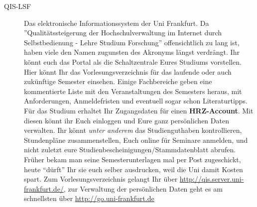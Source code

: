 \begin{description}
\item[QIS-LSF] Das elektronische Informationssystem der Uni Frankfurt.  Da
''Qualitätssteigerung der Hochschulverwaltung im Internet durch Selbstbedienung
- Lehre Studium Forschung'' offensichtlich zu lang ist, haben viele den Namen
zugunsten des Akronyms längst verdrängt.  Ihr könnt euch das Portal als die
Schaltzentrale Eures Studiums vorstellen. Hier könnt Ihr das
Vorlesungsverzeichnis für das laufende oder auch zukünftige Semester einsehen.
Einige Fachbereiche geben eine kommentierte Liste mit den Veranstaltungen des
Semesters heraus, mit Anforderungen, Anmeldefristen und eventuell sogar schon
Literaturtipps.
Für das Studium erhaltet Ihr Zugangsdaten für einen
\textbf{HRZ-Account}. Mit diesen könnt ihr Euch einloggen und Eure
ganz persönlichen Daten verwalten. Ihr könnt \textsl{unter anderem}
das Studienguthaben kontrollieren, Stundenpläne zusammenstellen, Euch
online für Seminare anmelden, und nicht zuletzt eure
Studienbescheinigungen/Stammdatenblatt abrufen. Früher bekam man seine
Semesterunterlagen mal per Post zugeschickt, heute ``dürft'' Ihr sie
euch selber ausdrucken, weil die Uni damit Kosten spart. Zum
Vorlesungsverzeichnis gelangt Ihr über
\url{http://qis.server.uni-frankfurt.de/}, zur Verwaltung der
persönlichen Daten geht es am schnellsten über
\url{http://go.uni-frankfurt.de}




\end{description}
